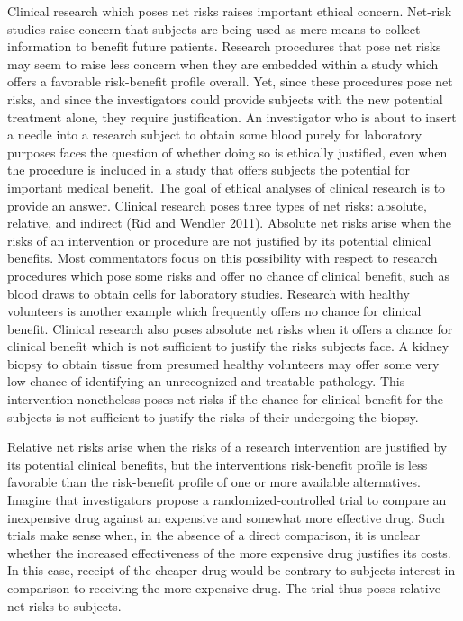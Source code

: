 \documentclass[12p]{article}
\begin{document}
Clinical research which poses net risks raises important ethical concern. Net-risk studies raise concern that subjects are being used as mere means to collect information to benefit future patients. Research procedures that pose net risks may seem to raise less concern when they are embedded within a study which offers a favorable risk-benefit profile overall. Yet, since these procedures pose net risks, and since the investigators could provide subjects with the new potential treatment alone, they require justification. An investigator who is about to insert a needle into a research subject to obtain some blood purely for laboratory purposes faces the question of whether doing so is ethically justified, even when the procedure is included in a study that offers subjects the potential for important medical benefit. The goal of ethical analyses of clinical research is to provide an answer. Clinical research poses three types of net risks: absolute, relative, and indirect (Rid and Wendler 2011). Absolute net risks arise when the risks of an intervention or procedure are not justified by its potential clinical benefits. Most commentators focus on this possibility with respect to research procedures which pose some risks and offer no chance of clinical benefit, such as blood draws to obtain cells for laboratory studies. Research with healthy volunteers is another example which frequently offers no chance for clinical benefit. Clinical research also poses absolute net risks when it offers a chance for clinical benefit which is not sufficient to justify the risks subjects face. A kidney biopsy to obtain tissue from presumed healthy volunteers may offer some very low chance of identifying an unrecognized and treatable pathology. This intervention nonetheless poses net risks if the chance for clinical benefit for the subjects is not sufficient to justify the risks of their undergoing the biopsy.

Relative net risks arise when the risks of a research intervention are justified by its potential clinical benefits, but the interventions risk-benefit profile is less favorable than the risk-benefit profile of one or more available alternatives. Imagine that investigators propose a randomized-controlled trial to compare an inexpensive drug against an expensive and somewhat more effective drug. Such trials make sense when, in the absence of a direct comparison, it is unclear whether the increased effectiveness of the more expensive drug justifies its costs. In this case, receipt of the cheaper drug would be contrary to subjects interest in comparison to receiving the more expensive drug. The trial thus poses relative net risks to subjects.
\end{document}
